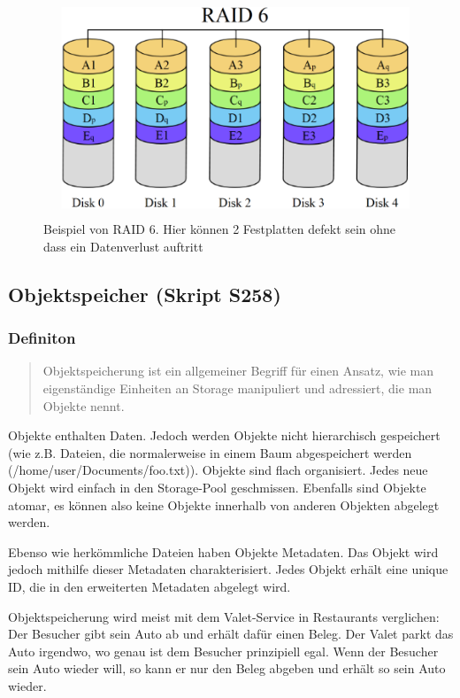 \documentclass[a4paper, 11pt, nofootinbib]{article}
\begin{document}
\begin{figure}[htb]
	\centering
	\includegraphics[keepaspectratio=true,height=9\baselineskip]{raid.png}
	\caption{Beispiel von RAID 6. Hier können 2 Festplatten defekt sein ohne dass ein Datenverlust auftritt}
	\label{fig:raid}
\end{figure}

\newpage

\subsection{Objektspeicher (Skript S258)}

\subsubsection{Definiton}
\begin{center}
\blockquote{Objektspeicherung ist ein allgemeiner Begriff für einen Ansatz, wie man eigenständige Einheiten an Storage manipuliert und adressiert, die man Objekte nennt.}
\end{center}

Objekte enthalten Daten. Jedoch werden Objekte nicht hierarchisch gespeichert (wie z.B. Dateien, die normalerweise in einem Baum abgespeichert werden (/home/user/Documents/foo.txt)). Objekte sind flach organisiert. Jedes neue Objekt wird einfach in den Storage-Pool geschmissen. Ebenfalls sind Objekte atomar, es können also keine Objekte innerhalb von anderen Objekten abgelegt werden.

Ebenso wie herkömmliche Dateien haben Objekte Metadaten. Das Objekt wird jedoch mithilfe dieser Metadaten charakterisiert. Jedes Objekt erhält eine unique ID, die in den erweiterten Metadaten abgelegt wird.

Objektspeicherung wird meist mit dem Valet-Service in Restaurants verglichen: Der Besucher gibt sein Auto ab und erhält dafür einen Beleg. Der Valet parkt das Auto irgendwo, wo genau ist dem Besucher prinzipiell egal. Wenn der Besucher sein Auto wieder will, so kann er nur den Beleg abgeben und erhält so sein Auto wieder. 
\end{document}
